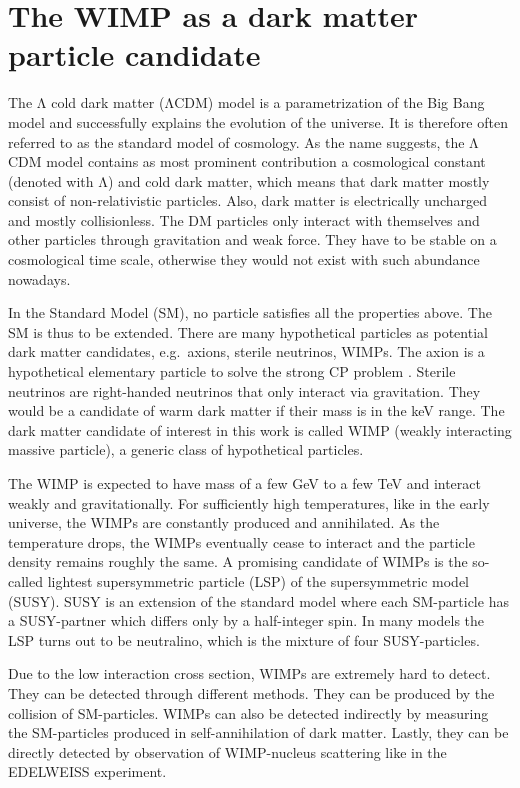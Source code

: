 \section{The WIMP as a dark matter particle candidate}
The $\mathrm{\Lambda}$ cold dark matter ($\mathrm{\Lambda}$CDM) model is a parametrization of the Big Bang model and successfully explains the evolution of the universe. It is therefore often referred to as the standard model of cosmology. As the name suggests, the $\mathrm{\Lambda}$CDM model contains as most prominent contribution a cosmological constant (denoted with $\mathrm{\Lambda}$) and cold dark matter, which means that dark matter mostly consist of non-relativistic particles. Also, dark matter is electrically uncharged and mostly collisionless. The DM particles only interact with themselves and other particles through gravitation and weak force. They have to be stable on a cosmological time scale, otherwise they would not exist with such abundance nowadays.

In the Standard Model (SM), no particle satisfies all the properties above. The SM is thus to be extended. There are many hypothetical particles as potential dark matter candidates, e.g.\ axions, sterile neutrinos, WIMPs. The axion is a hypothetical elementary particle to solve the strong CP problem \cite{Pec77}. Sterile neutrinos are right-handed neutrinos that only interact via gravitation. They would be a candidate of warm dark matter if their mass is in the keV range. The dark matter candidate of interest in this work is called WIMP (weakly interacting massive particle), a generic class of hypothetical particles.

The WIMP is expected to have mass of a few GeV to a few TeV and interact weakly and gravitationally.  For sufficiently high temperatures, like in the early universe, the WIMPs are constantly produced and annihilated. As the temperature drops, the WIMPs eventually cease to interact and the particle density remains roughly the same. A promising candidate of WIMPs is the so-called lightest supersymmetric particle (LSP) of the supersymmetric model (SUSY). SUSY is an extension of the standard model where each SM-particle has a SUSY-partner which differs only by a half-integer spin. In many models the LSP turns out to be neutralino, which is the mixture of four SUSY-particles.

Due to the low interaction cross section, WIMPs are extremely hard to detect. They can be detected through different methods. They can be produced by the collision of SM-particles. WIMPs can also be detected indirectly by measuring the SM-particles produced in self-annihilation of dark matter. Lastly, they can be directly detected by observation of WIMP-nucleus scattering like in the EDELWEISS experiment.

